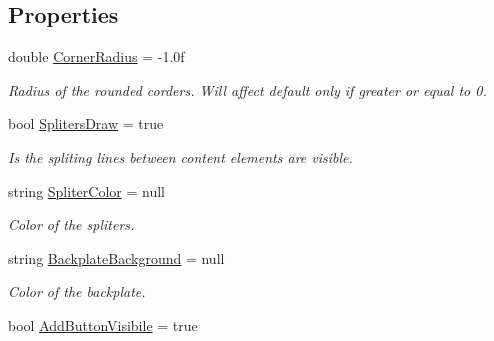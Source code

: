\subsection*{Properties}
\begin{DoxyCompactItemize}
\item 
double \mbox{\hyperlink{class_wpf_handler_1_1_u_i_1_1_auto_layout_1_1_options_1_1_auto_collection_properties_attribute_a7a137eb3059dd6d79f4edd9cee95769c}{Corner\+Radius}} = -\/1.\+0f
\begin{DoxyCompactList}\small\item\em Radius of the rounded corders. Will affect default only if greater or equal to 0. \end{DoxyCompactList}\item 
bool \mbox{\hyperlink{class_wpf_handler_1_1_u_i_1_1_auto_layout_1_1_options_1_1_auto_collection_properties_attribute_a515d5509449af3cb2a46a770fb454778}{Spliters\+Draw}} = true
\begin{DoxyCompactList}\small\item\em Is the spliting lines between content elements are visible. \end{DoxyCompactList}\item 
string \mbox{\hyperlink{class_wpf_handler_1_1_u_i_1_1_auto_layout_1_1_options_1_1_auto_collection_properties_attribute_a3d0bb6abd7d843bca5d6042e341dec7b}{Spliter\+Color}} = null
\begin{DoxyCompactList}\small\item\em Color of the spliters. \end{DoxyCompactList}\item 
string \mbox{\hyperlink{class_wpf_handler_1_1_u_i_1_1_auto_layout_1_1_options_1_1_auto_collection_properties_attribute_a88ab71f9762a0d8425ebf57f72c0b2aa}{Backplate\+Background}} = null
\begin{DoxyCompactList}\small\item\em Color of the backplate. \end{DoxyCompactList}\item 
bool \mbox{\hyperlink{class_wpf_handler_1_1_u_i_1_1_auto_layout_1_1_options_1_1_auto_collection_properties_attribute_aa93230d17f835aa86a64d12914ac482e}{Add\+Button\+Visibile}} = true

\end{DoxyCompactItemize}
